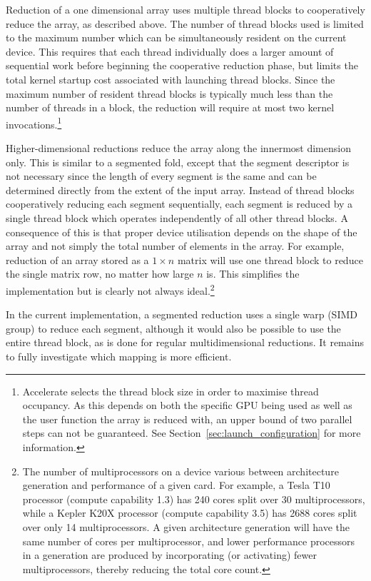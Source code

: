 Reduction of a one dimensional array uses multiple thread blocks to cooperatively reduce the array, as described above. The number of
thread blocks used is limited to the maximum number which can be simultaneously
resident on the current device. This requires that each thread individually does
a larger amount of sequential work before beginning the cooperative reduction
phase, but limits the total kernel startup cost associated with launching thread
blocks. Since the maximum number of resident thread blocks is typically much
less than the number of threads in a block, the reduction will require at most
two kernel invocations.\footnote{Accelerate selects the thread block size in
order to maximise thread occupancy. As this depends on both the specific GPU
being used as well as the user function the array is reduced with, an upper
bound of two parallel steps can not be guaranteed. See
Section~\ref{sec:launch_configuration} for more information.}

Higher-dimensional reductions reduce the array along the innermost dimension
only. This is similar to a segmented fold, except that the segment descriptor is
not necessary since the length of every segment is the same and can be
determined directly from the extent of the input array. Instead of thread blocks
cooperatively reducing each segment sequentially, each segment is reduced by a
single thread block which operates independently of all other thread blocks. A
consequence of this is that proper device utilisation depends on the shape of
the array and not simply the total number of elements in the array. For example,
reduction of an array stored as a $1 \times n$ matrix will use one thread
block to reduce the single matrix row,
no matter how large $n$ is. This simplifies the implementation but is clearly
not always ideal.\footnote{The number of multiprocessors on a device various
between architecture generation and performance of a given card. For example, a
Tesla T10 processor (compute capability 1.3) has 240 cores split over 30
multiprocessors, while a Kepler K20X processor (compute capability 3.5) has 2688
cores split over only 14 multiprocessors. A given architecture generation will
have the same number of cores per multiprocessor, and lower performance
processors in a generation are produced by incorporating (or activating) fewer
multiprocessors, thereby reducing the total core count.}

In the current implementation, a segmented reduction uses a single
warp\cuda[warp]{} (SIMD group) to reduce each segment, although it would also be
possible to use the entire thread block, as is done for regular multidimensional
reductions. It remains to fully investigate which mapping is more efficient.


